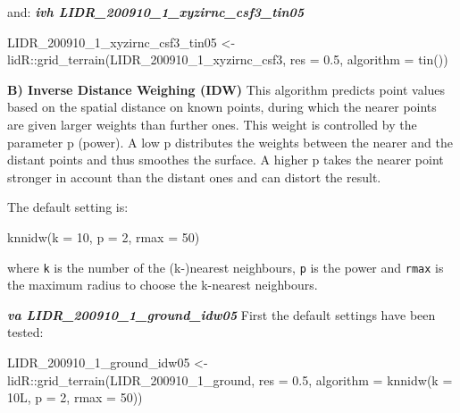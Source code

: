 \documentclass[
  12pt,
]{article}
\newenvironment{Shaded}{\begin{snugshade}}{\end{snugshade}}
\newcommand{\AttributeTok}[1]{\textcolor[rgb]{0.77,0.63,0.00}{#1}}
\newcommand{\DecValTok}[1]{\textcolor[rgb]{0.00,0.00,0.81}{#1}}
\newcommand{\FloatTok}[1]{\textcolor[rgb]{0.00,0.00,0.81}{#1}}
\newcommand{\FunctionTok}[1]{\textcolor[rgb]{0.00,0.00,0.00}{#1}}
\newcommand{\NormalTok}[1]{#1}
\newcommand{\OtherTok}[1]{\textcolor[rgb]{0.56,0.35,0.01}{#1}}
\newcommand{\SpecialCharTok}[1]{\textcolor[rgb]{0.00,0.00,0.00}{#1}}
\begin{document}
and:
\newline
\textbf{\emph{ivh LIDR\_200910\_1\_xyzirnc\_csf3\_tin05}}

\begin{Shaded}
\begin{Highlighting}[]
\NormalTok{LIDR\_200910\_1\_xyzirnc\_csf3\_tin05 }\OtherTok{\textless{}{-}}\NormalTok{ lidR}\SpecialCharTok{::}\FunctionTok{grid\_terrain}\NormalTok{(LIDR\_200910\_1\_xyzirnc\_csf3,}
    \AttributeTok{res =} \FloatTok{0.5}\NormalTok{, }\AttributeTok{algorithm =} \FunctionTok{tin}\NormalTok{())}
\end{Highlighting}
\end{Shaded}

\textbf{B) Inverse Distance Weighing (IDW)}
\newline
This algorithm predicts point values based on the spatial distance on known points, during which the nearer points are given larger weights than further ones. This weight is controlled by the parameter p (power). A low p distributes the weights between the nearer and the distant points and thus smoothes the surface. A higher p takes the nearer point stronger in account than the distant ones and can distort the result.

The default setting is:

\begin{Shaded}
\begin{Highlighting}[]
\FunctionTok{knnidw}\NormalTok{(}\AttributeTok{k =} \DecValTok{10}\NormalTok{, }\AttributeTok{p =} \DecValTok{2}\NormalTok{, }\AttributeTok{rmax =} \DecValTok{50}\NormalTok{)}
\end{Highlighting}
\end{Shaded}

where \texttt{k} is the number of the (k-)nearest neighbours, \texttt{p} is the power and \texttt{rmax} is the maximum radius to choose the k-nearest neighbours.

\textbf{\emph{va LIDR\_200910\_1\_ground\_idw05}}
\newline
First the default settings have been tested:

\begin{Shaded}
\begin{Highlighting}[]
\NormalTok{LIDR\_200910\_1\_ground\_idw05 }\OtherTok{\textless{}{-}}\NormalTok{ lidR}\SpecialCharTok{::}\FunctionTok{grid\_terrain}\NormalTok{(LIDR\_200910\_1\_ground, }\AttributeTok{res =} \FloatTok{0.5}\NormalTok{,}
    \AttributeTok{algorithm =} \FunctionTok{knnidw}\NormalTok{(}\AttributeTok{k =}\NormalTok{ 10L, }\AttributeTok{p =} \DecValTok{2}\NormalTok{, }\AttributeTok{rmax =} \DecValTok{50}\NormalTok{))}
\end{Highlighting}
\end{Shaded}
\end{document}
